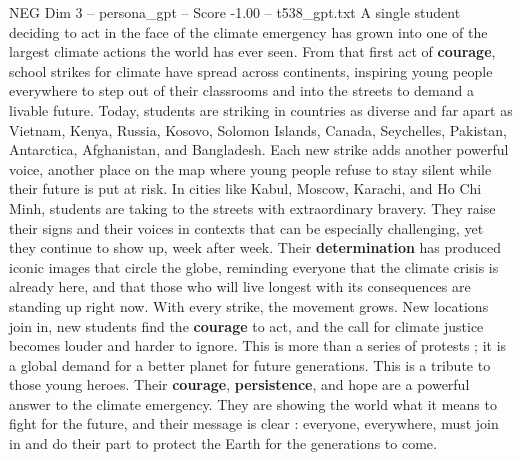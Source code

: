 \begin{textsample}{NEG Dim 3 – persona\_gpt – Score -1.00 – t538\_gpt.txt}  \label{ex:f3_neg_032}
A single student deciding to act in the face of the climate emergency has grown into one of the largest climate actions the world has ever seen.
From that first act of \textbf{courage}, school strikes for climate have spread across continents, inspiring young people everywhere to step out of their classrooms and into the streets to demand a livable future.
Today, students are striking in countries as diverse and far apart as Vietnam, Kenya, Russia, Kosovo, Solomon Islands, Canada, Seychelles, Pakistan, Antarctica, Afghanistan, and Bangladesh.
Each new strike adds another powerful voice, another place on the map where young people refuse to stay silent while their future is put at risk.
In cities like Kabul, Moscow, Karachi, and Ho Chi Minh, students are taking to the streets with extraordinary bravery.
They raise their signs and their voices in contexts that can be especially challenging, yet they continue to show up, week after week.
Their \textbf{determination} has produced iconic images that circle the globe, reminding everyone that the climate crisis is already here, and that those who will live longest with its consequences are standing up right now.
With every strike, the movement grows.
New locations join in, new students find the \textbf{courage} to act, and the call for climate justice becomes louder and harder to ignore.
This is more than a series of protests ; it is a global demand for a better planet for future generations.
This is a tribute to those young heroes.
Their \textbf{courage}, \textbf{persistence}, and hope are a powerful answer to the climate emergency.
They are showing the world what it means to fight for the future, and their message is clear : everyone, everywhere, must join in and do their part to protect the Earth for the generations to come.

\end{textsample}
